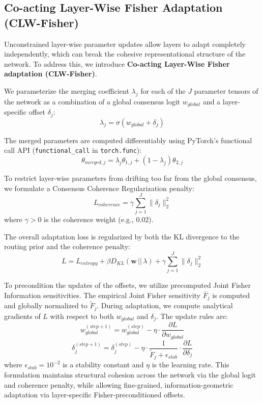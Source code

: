 \documentclass{article}
\theoremstyle{plain}
\theoremstyle{definition}
\theoremstyle{remark}
\begin{document}
\subsection{Co-acting Layer-Wise Fisher Adaptation (CLW-Fisher)}
Unconstrained layer-wise parameter updates allow layers to adapt completely independently, which can break the cohesive representational structure of the network. To address this, we introduce \textbf{Co-acting Layer-Wise Fisher adaptation (CLW-Fisher)}.

We parameterize the merging coefficient $\lambda_j$ for each of the $J$ parameter tensors of the network as a combination of a global consensus logit $w_{global}$ and a layer-specific offset $\delta_j$:
\begin{equation}
  \lambda_j = \sigma(w_{global} + \delta_j)
\end{equation}

The merged parameters are computed differentiably using PyTorch's functional call API (\texttt{functional\_call} in \texttt{torch.func}):
\begin{equation}
  \theta_{merged, j} = \lambda_j \theta_{1, j} + (1 - \lambda_j) \theta_{2, j}
\end{equation}

To restrict layer-wise parameters from drifting too far from the global consensus, we formulate a Consensus Coherence Regularization penalty:
\begin{equation}
  L_{coherence} = \gamma \sum_{j=1}^J \|\delta_j\|_2^2
\end{equation}
where $\gamma > 0$ is the coherence weight (e.g., $0.02$).

The overall adaptation loss is regularized by both the KL divergence to the routing prior and the coherence penalty:
\begin{equation}
  L = L_{entropy} + \beta D_{KL}(\mathbf{w} \,||\, \lambda) + \gamma \sum_{j=1}^J \|\delta_j\|_2^2
\end{equation}

To precondition the updates of the offsets, we utilize precomputed Joint Fisher Information sensitivities. The empirical Joint Fisher sensitivity $\bar{F}_j$ is computed and globally normalized to $\tilde{F}_j$. During adaptation, we compute analytical gradients of $L$ with respect to both $w_{global}$ and $\delta_j$. The update rules are:
\begin{equation}
  w_{global}^{(step+1)} = w_{global}^{(step)} - \eta \cdot \frac{\partial L}{\partial w_{global}}
\end{equation}
\begin{equation}
  \delta_j^{(step+1)} = \delta_j^{(step)} - \eta \cdot \frac{1}{\tilde{F}_j + \epsilon_{stab}} \cdot \frac{\partial L}{\partial \delta_j}
\end{equation}
where $\epsilon_{stab} = 10^{-2}$ is a stability constant and $\eta$ is the learning rate. This formulation maintains structural cohesion across the network via the global logit and coherence penalty, while allowing fine-grained, information-geometric adaptation via layer-specific Fisher-preconditioned offsets.
\end{document}

